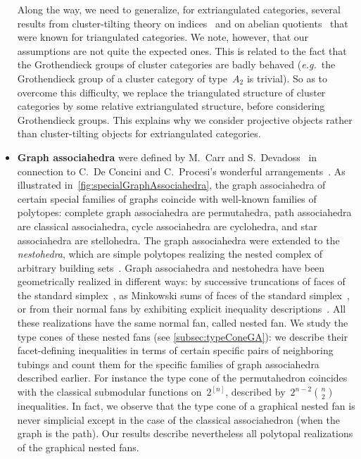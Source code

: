 \documentclass{amsart}
\theoremstyle{definition}
\newcommand{\eg}{\textit{e.g.}~} %
\newcommand{\darkblue}{\color{darkblue}} %
\newcommand{\defn}[1]{\textsl{\darkblue #1}} %
\begin{document}
\begin{itemize}
Along the way, we need to generalize, for extriangulated categories, several results from cluster-tilting theory on indices~\cite{DehyKeller} and on abelian quotients~\cite{BuanMarshReiten, KellerReiten} that were known for triangulated categories.
We note, however, that our assumptions are not quite the expected ones.
This is related to the fact that the Grothendieck groups of cluster categories are badly behaved (\eg the Grothendieck group of a cluster category of type~$A_2$ is trivial).
So as to overcome this difficulty, we replace the triangulated structure of cluster categories by some relative extriangulated structure, before considering Grothendieck groups.
This explains why we consider projective objects rather than cluster-tilting objects for extriangulated categories.

\smallskip
\item \textbf{Graph associahedra} were defined by M.~Carr and S.~Devadoss~\cite{CarrDevadoss} in connection to C.~De Concini and C.~Procesi's wonderful arrangements~\cite{DeConciniProcesi}. As illustrated in~\cref{fig:specialGraphAssociahedra}, the graph associahedra of certain special families of graphs coincide with well-known families of polytopes: complete graph associahedra are permutahedra, path associahedra are classical associahedra, cycle associahedra are cyclohedra, and star associahedra are stellohedra. The graph associahedra were extended to the \defn{nestohedra}, which are simple polytopes realizing the nested complex of arbitrary building sets~\cite{Postnikov, FeichtnerSturmfels}. Graph associahedra and nestohedra have been geometrically realized in different ways: by successive truncations of faces of the standard simplex~\cite{CarrDevadoss}, as Minkowski sums of faces of the standard simplex~\cite{Postnikov, FeichtnerSturmfels}, or from their normal fans by exhibiting explicit inequality descriptions~\cite{Devadoss, Zelevinsky}. All these realizations have the same normal fan, called nested fan. We study the type cones of these nested fans (see \cref{subsec:typeConeGA}): we describe their facet-defining inequalities in terms of certain specific pairs of neighboring tubings and count them for the specific families of graph associahedra described earlier. For instance the type cone of the permutahedron coincides with the classical submodular functions on~$2^{[n]}$, described by~$2^{n-2} \binom{n}{2}$ inequalities. In fact, we observe that the type cone of a graphical nested fan is never simplicial except in the case of the classical associahedron (when the graph is the path). Our results describe nevertheless all polytopal realizations of the graphical nested fans.
\end{itemize}
\end{document}
